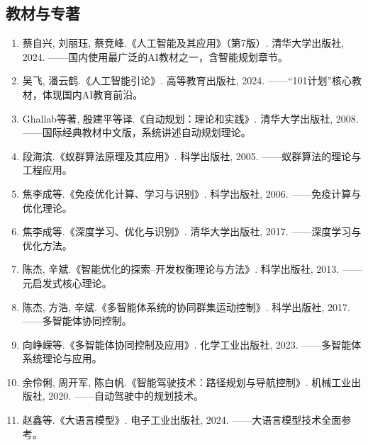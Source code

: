 \subsection*{教材与专著}
\begin{enumerate}
  \item 蔡自兴, 刘丽珏, 蔡竞峰.《人工智能及其应用》（第7版）. 清华大学出版社, 2024. ——国内使用最广泛的AI教材之一，含智能规划章节。
  \item 吴飞, 潘云鹤.《人工智能引论》. 高等教育出版社, 2024. ——``101计划''核心教材，体现国内AI教育前沿。
  \item Ghallab等著, 殷建平等译.《自动规划：理论和实践》. 清华大学出版社, 2008. ——国际经典教材中文版，系统讲述自动规划理论。
  \item 段海滨.《蚁群算法原理及其应用》. 科学出版社, 2005. ——蚁群算法的理论与工程应用。
  \item 焦李成等.《免疫优化计算、学习与识别》. 科学出版社, 2006. ——免疫计算与优化理论。
  \item 焦李成等.《深度学习、优化与识别》. 清华大学出版社, 2017. ——深度学习与优化方法。
  \item 陈杰, 辛斌.《智能优化的探索--开发权衡理论与方法》. 科学出版社, 2013. ——元启发式核心理论。
  \item 陈杰, 方浩, 辛斌.《多智能体系统的协同群集运动控制》. 科学出版社, 2017. ——多智能体协同控制。
  \item 向峥嵘等.《多智能体协同控制及应用》. 化学工业出版社, 2023. ——多智能体系统理论与应用。
  \item 余伶俐, 周开军, 陈白帆.《智能驾驶技术：路径规划与导航控制》. 机械工业出版社, 2020. ——自动驾驶中的规划技术。
  \item 赵鑫等.《大语言模型》. 电子工业出版社, 2024. ——大语言模型技术全面参考。
\end{enumerate}


